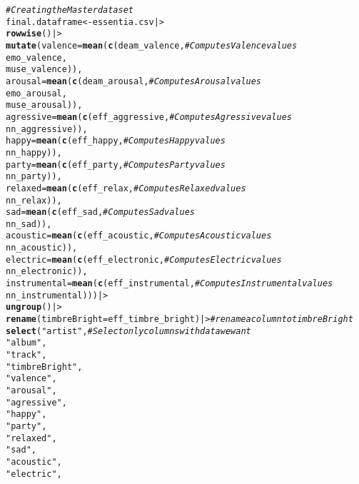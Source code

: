 \documentclass{article}\usepackage[]{graphicx}\usepackage[]{xcolor}
\makeatletter
\newcommand{\hlsng}[1]{\textcolor[rgb]{0.192,0.494,0.8}{#1}}%
\newcommand{\hlcom}[1]{\textcolor[rgb]{0.678,0.584,0.686}{\textit{#1}}}%
\newcommand{\hldef}[1]{\textcolor[rgb]{0.345,0.345,0.345}{#1}}%
\newcommand{\hlkwb}[1]{\textcolor[rgb]{0.69,0.353,0.396}{#1}}%
\newcommand{\hlkwc}[1]{\textcolor[rgb]{0.333,0.667,0.333}{#1}}%
\newcommand{\hlkwd}[1]{\textcolor[rgb]{0.737,0.353,0.396}{\textbf{#1}}}%
\newenvironment{kframe}{%
 \def\at@end@of@kframe{}%
 \ifinner\ifhmode%
  \def\at@end@of@kframe{\end{minipage}}%
  \begin{minipage}{\columnwidth}%
 \fi\fi%
 \def\FrameCommand##1{\hskip\@totalleftmargin \hskip-\fboxsep
 \colorbox{shadecolor}{##1}\hskip-\fboxsep
     \hskip-\linewidth \hskip-\@totalleftmargin \hskip\columnwidth}%
 \MakeFramed {\advance\hsize-\width
   \@totalleftmargin\z@ \linewidth\hsize
   \@setminipage}}%
 {\par\unskip\endMakeFramed%
 \at@end@of@kframe}
\newenvironment{knitrout}{}{} %
\makeatother
\begin{document}
\begin{enumerate}
\begin{knitrout}
\begin{kframe}
\begin{alltt}
\hlcom{#Creating the Master data set}
\hldef{final.dataframe} \hlkwb{<-} \hldef{essentia.csv |>}
  \hlkwd{rowwise}\hldef{() |>}
  \hlkwd{mutate}\hldef{(}\hlkwc{valence} \hldef{=} \hlkwd{mean}\hldef{(}\hlkwd{c}\hldef{(deam_valence,} \hlcom{#Computes Valence values}
                          \hldef{emo_valence,}
                          \hldef{muse_valence)),}
         \hlkwc{arousal} \hldef{=} \hlkwd{mean}\hldef{(}\hlkwd{c}\hldef{(deam_arousal,} \hlcom{#Computes Arousal values}
                          \hldef{emo_arousal,}
                          \hldef{muse_arousal)),}
         \hlkwc{agressive} \hldef{=} \hlkwd{mean}\hldef{(}\hlkwd{c}\hldef{(eff_aggressive,} \hlcom{#Computes Agressive values}
                            \hldef{nn_aggressive)),}
         \hlkwc{happy} \hldef{=} \hlkwd{mean}\hldef{(}\hlkwd{c}\hldef{(eff_happy,} \hlcom{#Computes Happy values}
                        \hldef{nn_happy)),}
         \hlkwc{party} \hldef{=} \hlkwd{mean}\hldef{(}\hlkwd{c}\hldef{(eff_party,} \hlcom{#Computes Party values}
                        \hldef{nn_party)),}
         \hlkwc{relaxed} \hldef{=} \hlkwd{mean}\hldef{(}\hlkwd{c}\hldef{(eff_relax,} \hlcom{#Computes Relaxed values}
                          \hldef{nn_relax)),}
         \hlkwc{sad} \hldef{=} \hlkwd{mean}\hldef{(}\hlkwd{c}\hldef{(eff_sad,} \hlcom{#Computes Sad values}
                      \hldef{nn_sad)),}
         \hlkwc{acoustic} \hldef{=} \hlkwd{mean}\hldef{(}\hlkwd{c}\hldef{(eff_acoustic,} \hlcom{#Computes Acoustic values}
                           \hldef{nn_acoustic)),}
         \hlkwc{electric} \hldef{=} \hlkwd{mean}\hldef{(}\hlkwd{c}\hldef{(eff_electronic,} \hlcom{#Computes Electric values}
                           \hldef{nn_electronic)),}
         \hlkwc{instrumental} \hldef{=} \hlkwd{mean}\hldef{(}\hlkwd{c}\hldef{(eff_instrumental,} \hlcom{#Computes Instrumental values}
                               \hldef{nn_instrumental))) |>}
  \hlkwd{ungroup}\hldef{() |>}
  \hlkwd{rename}\hldef{(}\hlkwc{timbreBright} \hldef{= eff_timbre_bright) |>} \hlcom{#rename a column to timbreBright}
  \hlkwd{select}\hldef{(}\hlsng{"artist"}\hldef{,} \hlcom{#  Select only columns with data we want}
         \hlsng{"album"}\hldef{,}
         \hlsng{"track"}\hldef{,}
         \hlsng{"timbreBright"}\hldef{,}
         \hlsng{"valence"}\hldef{,}
         \hlsng{"arousal"}\hldef{,}
         \hlsng{"agressive"}\hldef{,}
         \hlsng{"happy"}\hldef{,}
         \hlsng{"party"}\hldef{,}
         \hlsng{"relaxed"}\hldef{,}
         \hlsng{"sad"}\hldef{,}
         \hlsng{"acoustic"}\hldef{,}
         \hlsng{"electric"}\hldef{,}

\end{alltt}
\end{kframe}
\end{knitrout}
\end{enumerate}
\end{document}
